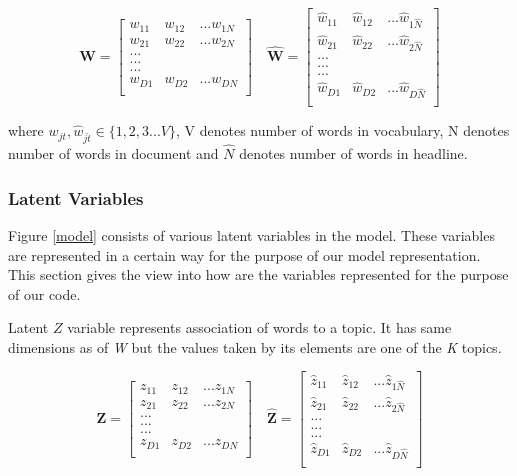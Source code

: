 \documentclass[a4paper]{article}
\begin{document}
\[
\mathbf{W} = 
   	\begin{bmatrix}
    w_{11} & w_{12} & ... w_{1N}\\	w_{21} & w_{22} & ... w_{2N}\\ ...\\ ...\\ ...\\  w_{D1} & w_{D2} & ... w_{DN}\\ \end{bmatrix} \quad
\mathbf{\hat{W}} = 
   	\begin{bmatrix}
    \hat{w}_{11} & \hat{w}_{12} & ... \hat{w}_{1\hat{N}}\\	\hat{w}_{21} & \hat{w}_{22} & ... \hat{w}_{2\hat{N}}\\ ...\\ ...\\ ...\\  \hat{w}_{D1} & \hat{w}_{D2} & ... \hat{w}_{D\hat{N}}\\ \end{bmatrix}
\]

where $w_{jt}, \hat{w}_{j\hat{t}} \in \{1,2,3 ... V \}$, V denotes number of words in vocabulary, N denotes number of words in document and $\hat{N}$ denotes number of words in headline.

\subsubsection{Latent Variables}

Figure \ref{model} consists of various latent variables in the model. These variables are represented in a certain way for the purpose of our model representation. This section gives the view into how are the variables represented for the purpose of our code. 

Latent $Z$ variable represents association of words to a topic. It has same dimensions as of \textit{W} but the values taken by its elements are one of the \textit{K} topics. 

\[
\textbf{Z} = 
   	\begin{bmatrix}
    z_{11} & z_{12} & ... z_{1N}\\	z_{21} & z_{22} & ... z_{2N}\\ ...\\ ...\\ ...\\  z_{D1} & z_{D2} & ... z_{DN}\\ \end{bmatrix} \quad
\mathbf{\hat{Z}} = 
   	\begin{bmatrix}
    \hat{z}_{11} & \hat{z}_{12} & ... \hat{z}_{1\hat{N}}\\	\hat{z}_{21} & \hat{z}_{22} & ... \hat{z}_{2\hat{N}}\\ ...\\ ...\\ ...\\  \hat{z}_{D1} & \hat{z}_{D2} & ... \hat{z}_{D\hat{N}}\\ \end{bmatrix}
\]
\end{document}
